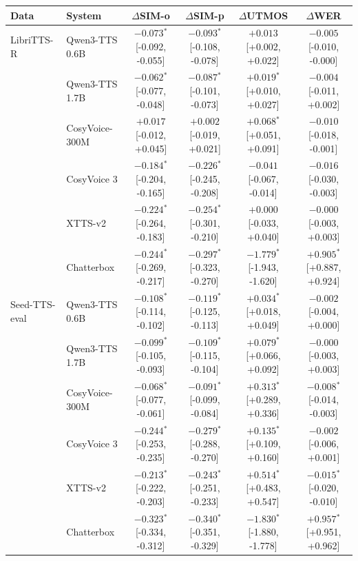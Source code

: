 \begin{tabular}{llcccc}
\toprule
\textbf{Data} & \textbf{System} & $\Delta$\textbf{SIM-o} & $\Delta$\textbf{SIM-p} & $\Delta$\textbf{UTMOS} & $\Delta$\textbf{WER} \\
\midrule
LibriTTS-R & Qwen3-TTS 0.6B & $-0.073$$^\ast$ \scriptsize{[-0.092, -0.055]} & $-0.093$$^\ast$ \scriptsize{[-0.108, -0.078]} & $+0.013$ \scriptsize{[+0.002, +0.022]} & $-0.005$ \scriptsize{[-0.010, -0.000]} \\
 & Qwen3-TTS 1.7B & $-0.062$$^\ast$ \scriptsize{[-0.077, -0.048]} & $-0.087$$^\ast$ \scriptsize{[-0.101, -0.073]} & $+0.019$$^\ast$ \scriptsize{[+0.010, +0.027]} & $-0.004$ \scriptsize{[-0.011, +0.002]} \\
 & CosyVoice-300M & $+0.017$ \scriptsize{[-0.012, +0.045]} & $+0.002$ \scriptsize{[-0.019, +0.021]} & $+0.068$$^\ast$ \scriptsize{[+0.051, +0.091]} & $-0.010$ \scriptsize{[-0.018, -0.001]} \\
 & CosyVoice 3 & $-0.184$$^\ast$ \scriptsize{[-0.204, -0.165]} & $-0.226$$^\ast$ \scriptsize{[-0.245, -0.208]} & $-0.041$ \scriptsize{[-0.067, -0.014]} & $-0.016$ \scriptsize{[-0.030, -0.003]} \\
 & XTTS-v2 & $-0.224$$^\ast$ \scriptsize{[-0.264, -0.183]} & $-0.254$$^\ast$ \scriptsize{[-0.301, -0.210]} & $+0.000$ \scriptsize{[-0.033, +0.040]} & $-0.000$ \scriptsize{[-0.003, +0.003]} \\
 & Chatterbox & $-0.244$$^\ast$ \scriptsize{[-0.269, -0.217]} & $-0.297$$^\ast$ \scriptsize{[-0.323, -0.270]} & $-1.779$$^\ast$ \scriptsize{[-1.943, -1.620]} & $+0.905$$^\ast$ \scriptsize{[+0.887, +0.924]} \\
\midrule
Seed-TTS-eval & Qwen3-TTS 0.6B & $-0.108$$^\ast$ \scriptsize{[-0.114, -0.102]} & $-0.119$$^\ast$ \scriptsize{[-0.125, -0.113]} & $+0.034$$^\ast$ \scriptsize{[+0.018, +0.049]} & $-0.002$ \scriptsize{[-0.004, +0.000]} \\
 & Qwen3-TTS 1.7B & $-0.099$$^\ast$ \scriptsize{[-0.105, -0.093]} & $-0.109$$^\ast$ \scriptsize{[-0.115, -0.104]} & $+0.079$$^\ast$ \scriptsize{[+0.066, +0.092]} & $-0.000$ \scriptsize{[-0.003, +0.003]} \\
 & CosyVoice-300M & $-0.068$$^\ast$ \scriptsize{[-0.077, -0.061]} & $-0.091$$^\ast$ \scriptsize{[-0.099, -0.084]} & $+0.313$$^\ast$ \scriptsize{[+0.289, +0.336]} & $-0.008$$^\ast$ \scriptsize{[-0.014, -0.003]} \\
 & CosyVoice 3 & $-0.244$$^\ast$ \scriptsize{[-0.253, -0.235]} & $-0.279$$^\ast$ \scriptsize{[-0.288, -0.270]} & $+0.135$$^\ast$ \scriptsize{[+0.109, +0.160]} & $-0.002$ \scriptsize{[-0.006, +0.001]} \\
 & XTTS-v2 & $-0.213$$^\ast$ \scriptsize{[-0.222, -0.203]} & $-0.243$$^\ast$ \scriptsize{[-0.251, -0.233]} & $+0.514$$^\ast$ \scriptsize{[+0.483, +0.547]} & $-0.015$$^\ast$ \scriptsize{[-0.020, -0.010]} \\
 & Chatterbox & $-0.323$$^\ast$ \scriptsize{[-0.334, -0.312]} & $-0.340$$^\ast$ \scriptsize{[-0.351, -0.329]} & $-1.830$$^\ast$ \scriptsize{[-1.880, -1.778]} & $+0.957$$^\ast$ \scriptsize{[+0.951, +0.962]} \\
\bottomrule
\end{tabular}
